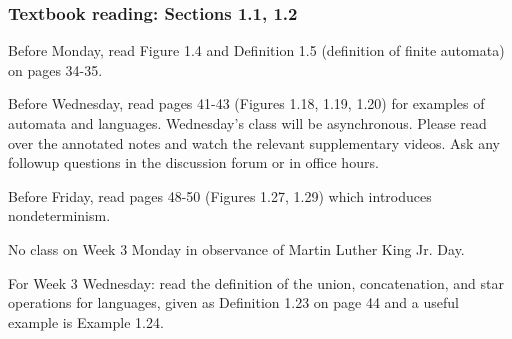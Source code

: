 \subsubsection*{Textbook reading: Sections 1.1, 1.2}

\vspace{-15pt}

Before Monday, read Figure 1.4 and Definition 1.5 (definition of finite automata) on pages 34-35.

Before Wednesday, read pages 41-43 (Figures 1.18, 1.19, 1.20) for examples of automata and languages. Wednesday's class will be asynchronous. Please read over the annotated notes and watch the relevant supplementary videos. Ask any followup questions in the discussion forum or in office hours.

Before Friday, read pages 48-50 (Figures 1.27, 1.29) which introduces nondeterminism.

No class on Week 3 Monday in observance of Martin Luther King Jr. Day.

For Week 3 Wednesday: read the definition of the union, concatenation, and star operations for languages,  given 
as Definition 1.23 on page 44 and a useful example is Example 1.24.

\vspace{-20pt}

